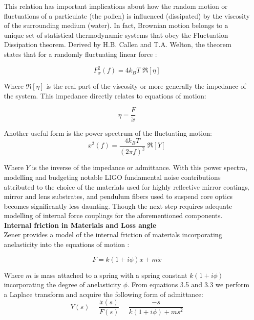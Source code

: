  This relation has important implications about how the random motion or fluctuations of a particulate (the pollen) is influenced (dissipated) by the viscosity of the surrounding medium (water). In fact, Brownian motion belongs to a unique set of statistical thermodynamic systems that obey the Fluctuation-Dissipation theorem. Derived by H.B. Callen and T.A. Welton, the theorem states that for a randomly fluctuating linear force \cite{Callen:1951}:

\begin{equation}
F_x^2(f) = 4 k_B T\; \Re[\eta]
\end{equation}

 \noindent Where $\Re[\eta]$ is the real part of the viscosity or more generally the impedance of the system. This impedance directly relates to equations of motion:

 \begin{equation}
 \eta = \frac{F}{\dot{x}}
 \end{equation}

\noindent Another useful form is the power spectrum of the fluctuating motion:
\begin{equation}\label{fdtpsd}
x^2 (f)  = \frac{4k_B T}{(2 \pi f)^2}\; \Re[Y]
\end{equation}

Where $Y$ is the inverse of the impedance or admittance. With this power spectra, modelling and budgeting notable LIGO fundamental noise contributions attributed to the choice of the materials used for highly reflective mirror coatings, mirror and lens substrates, and pendulum fibers used to suspend core optics becomes significantly less daunting. Though the next step requires adequate modelling of internal force couplings for the aforementioned components.
\\
\textbf{Internal friction in Materials and Loss angle}
\\
Zener provides a model of the internal friction of materials incorporating anelasticity into the equations of motion \cite{zener:1948}:

\begin{equation}
F = k(1+i\phi)x + m\ddot{x}
\end{equation}

Where $m$ is mass attached to a spring with a spring constant $k(1+ i\phi)$ incorporating the degree of anelasticity $\phi$. From equations 3.5 and 3.3 we perform a Laplace transform and acquire the following form of admittance:
\begin{equation}
Y(s) = \frac{\dot{x}(s)}{F(s)} = \frac{-s}{k(1+i\phi) + ms^2}
\end{equation}


